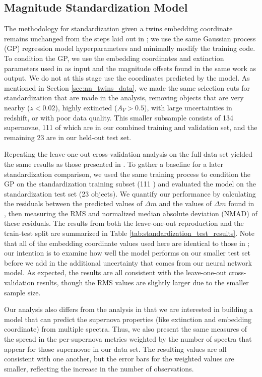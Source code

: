 \subsection{Magnitude Standardization Model}
The methodology for standardization given a twins embedding coordinate remains unchanged from the steps laid out in ; we use the same Gaussian process (GP) regression model hyperparameters and minimally modify the training code. To condition the GP, we use the embedding coordinates and extinction parameters used in  as input and the magnitude offsets found in the same work as output. We do not at this stage use the coordinates predicted by the \stoe{} model. As mentioned in Section \ref{sec:nn_twins_data}, we made the same selection cuts for standardization that are made in the  analysis, removing objects that are very nearby ($z<0.02$), highly extincted ($A_V > 0.5$), with large uncertainties in redshift, or with poor data quality. This smaller subsample consists of 134 supernovae, 111 of which are in our combined training and validation set, and the remaining 23 are in our held-out test set.

Repeating the leave-one-out cross-validation analysis on the full data set yielded the same results as those presented in . To gather a baseline for a later standardization comparison, we used the same training process to condition the GP on the standardization training subset (111 \sne) and evaluated the model on the standardization test set (23 objects). We quantify our performance by calculating the residuals between the predicted values of $\Delta m$ and the values of $\Delta m$ found in , then measuring the RMS and normalized median absolute deviation (NMAD) of these residuals. The results from both the leave-one-out reproduction and the train-test split are summarized in Table \ref{tab:standardization_test_results}. Note that all of the embedding coordinate values used here are identical to those in ; our intention is to examine how well the model performs on our smaller test set before we add in the additional uncertainty that comes from our neural network model. As expected, the results are all consistent with the leave-one-out cross-validation results, though the RMS values are slightly larger due to the smaller sample size.

Our analysis also differs from the  analysis in that we are interested in building a model that can predict the supernova properties (like extinction and embedding coordinate) from multiple spectra. Thus, we also present the same measures of the spread in the per-supernova metrics weighted by the number of spectra that appear for those supernovae in our data set. The resulting values are all consistent with one another, but the error bars for the weighted values are smaller, reflecting the increase in the number of observations.

